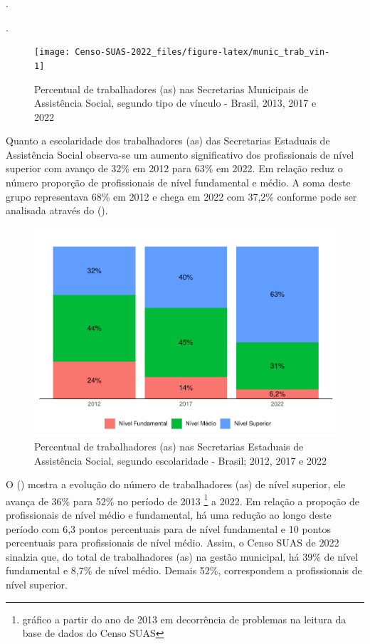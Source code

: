 \documentclass[
  brazilian]{report}
\begin{document}
.

.

\begin{figure}
\texttt{[image: Censo-SUAS-2022\_files/figure-latex/munic\_trab\_vin-1]} \caption[Percentual de trabalhadores (as) nas Secretarias Municipais de Assistência Social, segundo tipo de vínculo - Brasil, 2013, 2017 e 2022]{Percentual de trabalhadores (as) nas Secretarias Municipais de Assistência Social, segundo tipo de vínculo - Brasil, 2013, 2017 e 2022}\label{fig:munic_trab_vin}
\end{figure}

Quanto a escolaridade dos trabalhadores (as) das Secretarias Estaduais
de Assistência Social observa-se um aumento significativo dos
profissionais de nível superior com avanço de 32\% em 2012 para 63\% em
2022. Em relação reduz o número proporção de profissionais de nível
fundamental e médio. A soma deste grupo representava 68\% em 2012 e
chega em 2022 com 37,2\% conforme pode ser analisada através do
().

\begin{figure}
\includegraphics{Censo-SUAS-2022_files/figure-latex/uf_trab_form-1} \caption[Percentual de trabalhadores (as) nas Secretarias Estaduais de Assistência Social, segundo escolaridade - Brasil]{Percentual de trabalhadores (as) nas Secretarias Estaduais de Assistência Social, segundo escolaridade - Brasil; 2012, 2017 e 2022}\label{fig:uf_trab_form}
\end{figure}

O () mostra a evolução do número de
trabalhadores (as) de nível superior, ele avança de 36\% para 52\% no
período de 2013
\footnote{gráfico a partir do ano de 2013 em decorrência de problemas na leitura da base de dados do Censo SUAS}
a 2022. Em relação a propoção de profissionais de nível médio e
fundamental, há uma redução ao longo deste período com 6,3 pontos
percentuais para de nível fundamental e 10 pontos percentuais para
profissionais de nível médio. Assim, o Censo SUAS de 2022 sinalzia que,
do total de trabalhadores (as) na gestão municipal, há 39\% de nível
fundamental e 8,7\% de nível médio. Demais 52\%, correspondem a
profissionais de nível superior.
\end{document}
